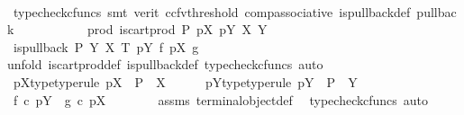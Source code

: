 \begin{isabellebody}
\ \ \ \ \ \ \ \ \isamarkupfalse%
\ {\isacharparenleft}{\kern0pt}typecheck{\isacharunderscore}{\kern0pt}cfuncs{\isacharcomma}{\kern0pt}\ smt\ {\isacharparenleft}{\kern0pt}verit{\isacharcomma}{\kern0pt}\ ccfv{\isacharunderscore}{\kern0pt}threshold{\isacharparenright}{\kern0pt}\ comp{\isacharunderscore}{\kern0pt}associative{}\ is{\isacharunderscore}{\kern0pt}pullback{\isacharunderscore}{\kern0pt}def\ pullback{\isacharparenright}{\kern0pt}\isanewline
\ \ \ \ \isamarkupfalse%
\isanewline
\ \ \isamarkupfalse%
\isanewline
{}\isamarkupfalse%
\isanewline
\ \ \isamarkupfalse%
\ prod{\isacharcolon}{\kern0pt}\ {\isachardoublequoteopen}is{\isacharunderscore}{\kern0pt}cart{\isacharunderscore}{\kern0pt}prod\ P\ pX\ pY\ X\ Y{\isachardoublequoteclose}\isanewline
\ \ \isamarkupfalse%
\ \isamarkupfalse%
\ {\isachardoublequoteopen}is{\isacharunderscore}{\kern0pt}pullback\ P\ Y\ X\ T\ pY\ f\ pX\ g{\isachardoublequoteclose}\isanewline
\ \ \isamarkupfalse%
{\isacharparenleft}{\kern0pt}unfold\ is{\isacharunderscore}{\kern0pt}cart{\isacharunderscore}{\kern0pt}prod{\isacharunderscore}{\kern0pt}def\ is{\isacharunderscore}{\kern0pt}pullback{\isacharunderscore}{\kern0pt}def{\isacharcomma}{\kern0pt}\ typecheck{\isacharunderscore}{\kern0pt}cfuncs{\isacharcomma}{\kern0pt}\ auto{\isacharparenright}{\kern0pt}\isanewline
\ \ \ \ \isamarkupfalse%
\ pX{\isacharunderscore}{\kern0pt}type{\isacharbrackleft}{\kern0pt}type{\isacharunderscore}{\kern0pt}rule{\isacharbrackright}{\kern0pt}{\isacharcolon}{\kern0pt}\ {\isachardoublequoteopen}pX\ {\isacharcolon}{\kern0pt}\ P\ {\isasymrightarrow}\ X{\isachardoublequoteclose}\isanewline
\ \ \ \ \isamarkupfalse%
\ pY{\isacharunderscore}{\kern0pt}type{\isacharbrackleft}{\kern0pt}type{\isacharunderscore}{\kern0pt}rule{\isacharbrackright}{\kern0pt}{\isacharcolon}{\kern0pt}\ {\isachardoublequoteopen}pY\ {\isacharcolon}{\kern0pt}\ P\ {\isasymrightarrow}\ Y{\isachardoublequoteclose}\isanewline
\ \ \ \ \isamarkupfalse%
\ {\isachardoublequoteopen}f\ {\isasymcirc}\isactrlsub c\ pY\ {\isacharequal}{\kern0pt}\ g\ {\isasymcirc}\isactrlsub c\ pX{\isachardoublequoteclose}\isanewline
\ \ \ \ \ \ \isamarkupfalse%
\ assms{\isacharparenleft}{\kern0pt}{}{\isacharparenright}{\kern0pt}\ terminal{\isacharunderscore}{\kern0pt}object{\isacharunderscore}{\kern0pt}def\ \isamarkupfalse%
\ {\isacharparenleft}{\kern0pt}typecheck{\isacharunderscore}{\kern0pt}cfuncs{\isacharcomma}{\kern0pt}\ auto{\isacharparenright}{\kern0pt}\ \ \isanewline

\end{isabellebody}
